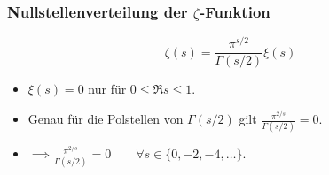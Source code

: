 \begin{frame}
    \frametitle{Nullstellenverteilung der $\zeta$-Funktion}
    \[
        \zeta(s) = \frac{\pi^{s/2}}{\Gamma(s/2)}\xi(s)  
    \]
    \begin{itemize}
        \item<2-> $\xi(s) = 0$ nur für $0 \leq \Re s \leq 1$.
        \item<3-> Genau für die Polstellen von $\Gamma(s/2)$ gilt $\frac{\pi^{2/s}}{\Gamma(s/2)} = 0$.
        \item<4-> $\implies \frac{\pi^{2/s}}{\Gamma(s/2)} = 0\qquad \forall s \in \{0,-2, -4, \dots\}$.
    \end{itemize}
\end{frame}